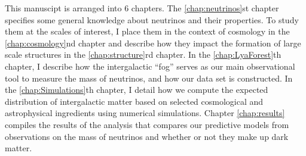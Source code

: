 \begin{intro}
This manuscipt is arranged into 6 chapters. The \ref{chap:neutrinos}st chapter specifies some general knowledge about neutrinos and their properties. To study them at the scales of interest, I place them in the context of cosmology in the \ref{chap:cosmology}nd chapter and describe how they impact the formation of large scale structures in the \ref{chap:structure}rd chapter. In the \ref{chap:LyaForest}th chapter, I describe how the intergalactic ``fog'' serves as our main observational tool to measure the mass of neutrinos, and how our data set is constructed. In the \ref{chap:Simulations}th chapter, I detail how we compute the expected distribution of intergalactic matter based on selected cosmological and astrophysical ingredients using numerical simulations. Chapter \ref{chap:results} compiles the results of the analysis that compares our predictive models from observations on the mass of neutrinos and whether or not they make up dark matter.

\end{intro}

